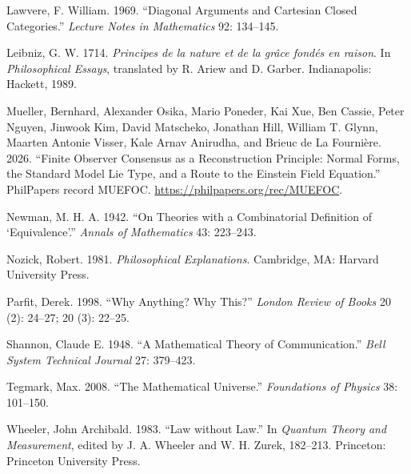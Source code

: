 \documentclass[
  11pt,
]{article}
\begin{document}
Lawvere, F. William. 1969. ``Diagonal Arguments and Cartesian Closed
Categories.'' \emph{Lecture Notes in Mathematics} 92: 134--145.

Leibniz, G. W. 1714. \emph{Principes de la nature et de la grâce fondés
en raison}. In \emph{Philosophical Essays}, translated by R. Ariew and
D. Garber. Indianapolis: Hackett, 1989.

Mueller, Bernhard, Alexander Osika, Mario Poneder, Kai Xue, Ben Cassie, Peter
Nguyen, Jinwook Kim, David Matscheko, Jonathan Hill, William T. Glynn, Maarten
Antonie Visser, Kale Arnav Anirudha, and Brieuc de La Fournière. 2026. ``Finite
Observer Consensus as a Reconstruction Principle: Normal Forms, the Standard
Model Lie Type, and a Route to the Einstein Field Equation.'' PhilPapers record
MUEFOC. \url{https://philpapers.org/rec/MUEFOC}.

Newman, M. H. A. 1942. ``On Theories with a Combinatorial Definition of
`Equivalence'.'' \emph{Annals of Mathematics} 43: 223--243.

Nozick, Robert. 1981. \emph{Philosophical Explanations}. Cambridge, MA:
Harvard University Press.

Parfit, Derek. 1998. ``Why Anything? Why This?'' \emph{London Review of
Books} 20 (2): 24--27; 20 (3): 22--25.

Shannon, Claude E. 1948. ``A Mathematical Theory of Communication.''
\emph{Bell System Technical Journal} 27: 379--423.

Tegmark, Max. 2008. ``The Mathematical Universe.'' \emph{Foundations of
Physics} 38: 101--150.

Wheeler, John Archibald. 1983. ``Law without Law.'' In \emph{Quantum
Theory and Measurement}, edited by J. A. Wheeler and W. H. Zurek,
182--213. Princeton: Princeton University Press.
\end{document}
